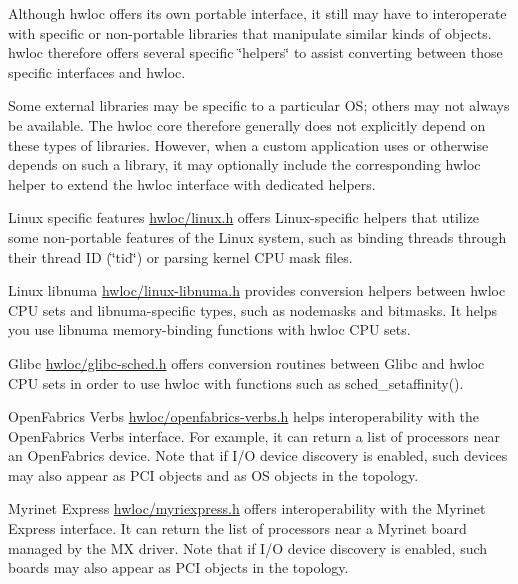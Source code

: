 Although hwloc offers its own portable interface, it still may have to interoperate with specific or non-\/portable libraries that manipulate similar kinds of objects. hwloc therefore offers several specific \char`\"{}helpers\char`\"{} to assist converting between those specific interfaces and hwloc.

Some external libraries may be specific to a particular OS; others may not always be available. The hwloc core therefore generally does not explicitly depend on these types of libraries. However, when a custom application uses or otherwise depends on such a library, it may optionally include the corresponding hwloc helper to extend the hwloc interface with dedicated helpers.


\begin{DoxyDescription}
\item[Linux specific features ]\hyperlink{a00035_source}{hwloc/linux.h} offers Linux-\/specific helpers that utilize some non-\/portable features of the Linux system, such as binding threads through their thread ID (\char`\"{}tid\char`\"{}) or parsing kernel CPU mask files. 


\item[Linux libnuma ]\hyperlink{a00034_source}{hwloc/linux-\/libnuma.h} provides conversion helpers between hwloc CPU sets and libnuma-\/specific types, such as nodemasks and bitmasks. It helps you use libnuma memory-\/binding functions with hwloc CPU sets. 


\item[Glibc ]\hyperlink{a00030_source}{hwloc/glibc-\/sched.h} offers conversion routines between Glibc and hwloc CPU sets in order to use hwloc with functions such as sched\_\-setaffinity(). 


\item[OpenFabrics Verbs ]\hyperlink{a00037_source}{hwloc/openfabrics-\/verbs.h} helps interoperability with the OpenFabrics Verbs interface. For example, it can return a list of processors near an OpenFabrics device. Note that if I/O device discovery is enabled, such devices may also appear as PCI objects and as OS objects in the topology. 


\item[Myrinet Express ]\hyperlink{a00036_source}{hwloc/myriexpress.h} offers interoperability with the Myrinet Express interface. It can return the list of processors near a Myrinet board managed by the MX driver. Note that if I/O device discovery is enabled, such boards may also appear as PCI objects in the topology. 



\end{DoxyDescription}
